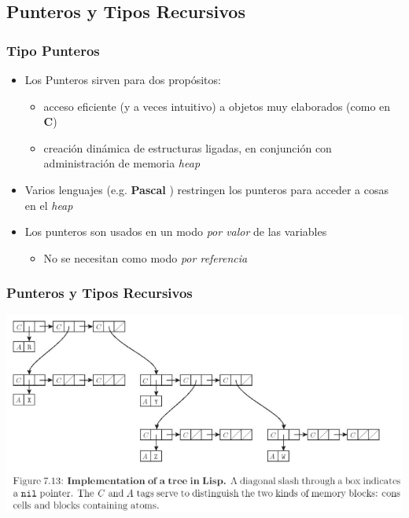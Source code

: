 \documentclass[11pt]{article}
\begin{document}
\subsection*{Punteros y Tipos Recursivos}
\label{sec:orgheadline46}

\subsubsection*{Tipo Punteros}
\label{sec:orgheadline41}
\begin{itemize}
\item Los Punteros sirven para dos propósitos:
\begin{itemize}
\item acceso eficiente (y a veces intuitivo) a objetos muy elaborados
(como en \textbf{C})
\item creación dinámica de estructuras ligadas, en conjunción con
administración de memoria \emph{heap}
\end{itemize}
\item Varios lenguajes (e.g. \textbf{Pascal} ) restringen los punteros para
acceder a cosas en el \emph{heap}
\item Los punteros son usados en un modo \emph{por valor} de las variables
\begin{itemize}
\item No se necesitan como modo \emph{por referencia}
\end{itemize}
\end{itemize}

\subsubsection*{Punteros y Tipos Recursivos}
\label{sec:orgheadline42}

\includegraphics[width=.9\linewidth]{lisppunt.png}
\end{document}
